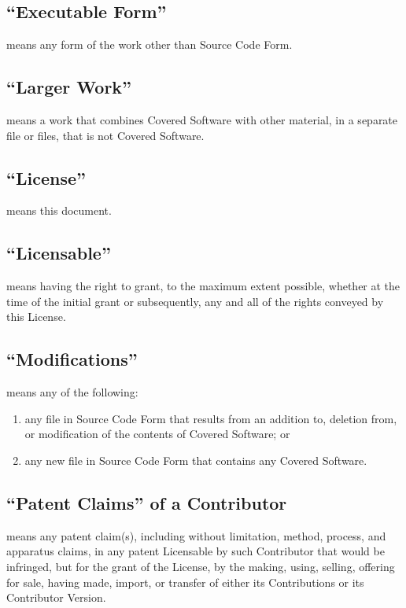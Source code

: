 \documentclass[a4paper, 12pt]{article}
\begin{document}
\subsection{``Executable Form''}
means any form of the work other than Source Code Form.

\subsection{``Larger Work''}
means a work that combines Covered Software with other material, in a separate file or files, that is not Covered Software.

\subsection{``License''}
means this document.

\subsection{``Licensable''}
means having the right to grant, to the maximum extent possible, whether at the time of the initial grant or subsequently, any and all of the rights conveyed by this License.

\subsection{``Modifications''}
means any of the following:

\begin{enumerate}[label=(\alph*)]
\item any file in Source Code Form that results from an addition to, deletion from, or modification of the contents of Covered Software; or
\item any new file in Source Code Form that contains any Covered Software.
\end{enumerate}

\subsection{``Patent Claims'' of a Contributor}
means any patent claim(s), including without limitation, method, process, and apparatus claims, in any patent Licensable by such Contributor that would be infringed, but for the grant of the License, by the making, using, selling, offering for sale, having made, import, or transfer of either its Contributions or its Contributor Version.
\end{document}
